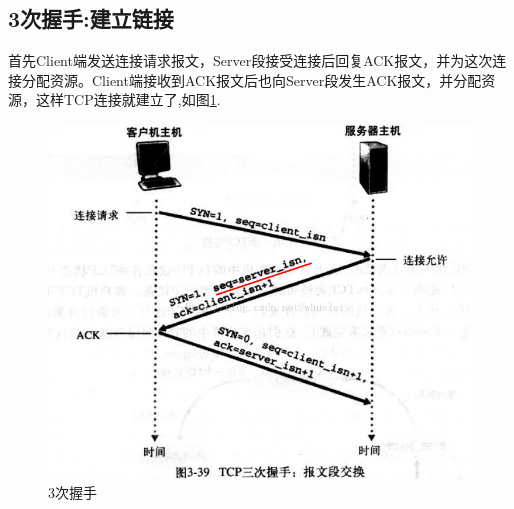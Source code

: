 \documentclass[UTF8,a4paper,12pt]{ctexbook}
\begin{document}
		\newpage
		\subsection{3次握手:建立链接}
			首先Client端发送连接请求报文，Server段接受连接后回复ACK报文，并为这次连接分配资源。Client端接收到ACK报文后也向Server段发生ACK报文，并分配资源，这样TCP连接就建立了,如图\ref{3times}.
			
			\begin{figure}[ht]
				\centering
				\includegraphics[scale = 0.5]{figures/TCP-3times.png}
				\caption{3次握手}
				\label{3times}
			\end{figure}
			
\end{document}
